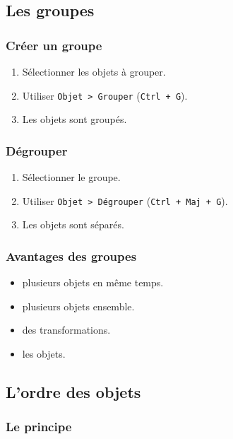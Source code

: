 \subsection{Les groupes}

\subsubsection{Créer un groupe}

\begin{enumerate}
    \item Sélectionner les objets à grouper.
    \item Utiliser \texttt{Objet > Grouper} (\texttt{Ctrl + G}).
    \item Les objets sont groupés.
\end{enumerate}

\subsubsection{Dégrouper}

\begin{enumerate}
    \item Sélectionner le groupe.
    \item Utiliser \texttt{Objet > Dégrouper} (\texttt{Ctrl + Maj + G}).
    \item Les objets sont séparés.
\end{enumerate}

\subsubsection{Avantages des groupes}

\begin{itemize}
    \item {} plusieurs objets en même temps.
    \item {} plusieurs objets ensemble.
    \item {} des transformations.
    \item {} les objets.
\end{itemize}

\subsection{L'ordre des objets}

\subsubsection{Le principe}

